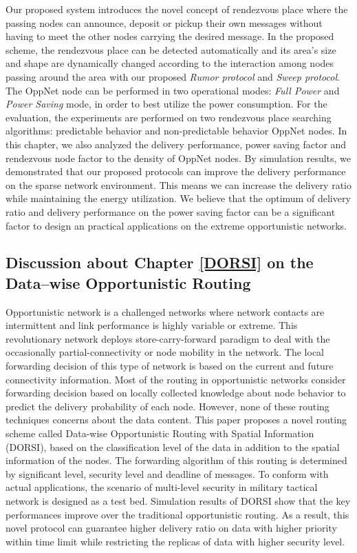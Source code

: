 Our proposed system introduces the novel concept of rendezvous place where the passing nodes can announce, deposit or pickup their own messages without having to meet the other nodes carrying the desired message.
In the proposed scheme, the rendezvous place can be detected automatically and its area's size and shape are dynamically changed according to the interaction among nodes passing around the area with our proposed \emph{Rumor protocol} and \emph{Sweep protocol}.
The OppNet node can be performed in two operational modes: \emph{Full Power} and \emph{Power Saving} mode, in order to best utilize the power consumption.
For the evaluation, the experiments are performed on two rendezvous place searching algorithms: predictable behavior and non-predictable behavior OppNet nodes.
In this chapter, we also analyzed the delivery performance, power saving factor and rendezvous node factor to the density of OppNet nodes.
By simulation results, we demonstrated that our proposed protocols can improve the delivery performance on the sparse network environment.
This means we can increase the delivery ratio while maintaining the energy utilization.
We believe that the optimum of delivery ratio and delivery performance on the power saving factor can be a significant factor to design an practical applications on the extreme opportunistic networks.

\subsection{Discussion about Chapter \ref{DORSI} on the Data--wise Opportunistic Routing}

Opportunistic network is a challenged networks where network contacts are intermittent and link performance is highly variable or extreme. This revolutionary network deploys store-carry-forward paradigm to deal with the occasionally partial-connectivity or node mobility in the network. The local forwarding decision of this type of network is based on the current and future connectivity information. Most of the routing in opportunistic networks consider forwarding decision based on locally collected knowledge about node behavior to predict the delivery probability of each node. However, none of these routing techniques concerns about the data content. This paper proposes a novel routing scheme called Data-wise Opportunistic Routing with Spatial Information (DORSI), based on the classification level of the data in addition to the spatial information of the nodes. The forwarding algorithm of this routing is determined by significant level, security level and deadline of messages. To conform with actual applications, the scenario of multi-level security in military tactical network is designed as a test bed. Simulation results of DORSI show that the key performances improve over the traditional opportunistic routing. As a result, this novel protocol can guarantee higher delivery ratio on data with higher priority within time limit while restricting the replicas of data with higher security level.

